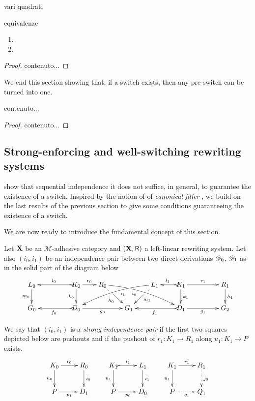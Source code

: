 \begin{remark} 
vari quadrati
\end{remark} 

\begin{lemma}
	equivalenze
	
	\begin{enumerate}
		\item 
		\item 
	\end{enumerate}
\end{lemma}
\begin{proof}
	contenuto...
\end{proof}

We end this section showing that, if a switch exists, then any pre-switch can be turned into one.

\begin{proposition}
	contenuto...
\end{proposition}
\begin{proof}
	contenuto...
\end{proof}


\subsection{Strong-enforcing and well-switching rewriting systems}

 show that sequential independence it does not suffice, in general, to guarantee the existence of a switch.  Inspired by the notion of of \emph{canonical filler}
\cite{heindel2009category}, we build on the last results of the previous section to give some conditions guaranteeing the existence of a switch. 




We are now ready to introduce the fundamental concept of this section.

\begin{definition}
	\label{def:strong}
	Let $\textbf {\textup{X}}$ be an $\mathcal{M}$-adhesive category 
	and $(\textbf {\textup{X}}, \mathsf{R})$ a left-linear rewriting system. 
	Let also $(i_0, i_1)$ be an independence pair between two direct
	derivations $\mathscr{D}_0$, $\mathscr{D}_1$
	as in the solid part of the diagram below
	\[\xymatrix@R=20pt@C=20pt{L_0 \ar[d]_{m_0}&& K_0
	\ar[d]_{k_0}\ar@{>->}[ll]_{l_0} \ar[r]^{r_0} & R_0
	\ar@/^.25cm/[drrr]|(.32)\hole_(.4){i_0}
	\ar[dr]|(.33)\hole_{h_0} && L_1 \ar@/_.25cm/[dlll]^(.4){i_1}
	\ar[dl]|(.33)\hole^{m_1}& K_1 \ar[d]^{k_1}\ar@{>->}[l]_{l_1}
	\ar[rr]^{r_1} && R_1 \ar[d]^{h_1}\\G_0 && \ar@{>->}[ll]^{f_0}
	D_0 \ar[rr]_{g_0}&& G_1 && \ar@{>->}[ll]^{f_1} D_1
	\ar[rr]_{g_1}&& G_2}
\]
	
	We say that $(i_0, i_1)$ is a \emph{strong independence pair} if
	the first two squares depicted  
	below are pushouts and if the pushout of $r_1 : K_1 \to R_1$ along $u_1 : K_1 \to P$ exists.
	\[
	\xymatrix{
		K_0 \ar[r]^{r_0} \ar[d]_{u_0}& R_0 \ar[d]^{i_0} & K_1
		\ar@{>->}[r]^{l_1} \ar[d]_{u_1}& L_1 \ar[d]^{i_1}
		&K_1 \ar[r]^{r_1} \ar[d]_{u_1}& R_1\ar@{.>}[d]^{j_0}
		\\
		P \ar[r]_{p_1} & D_1 &P \ar[r]_{p_0} & D_0
		& P \ar@{.>}[r]_{q_1} & Q_1
	}
	\]
\end{definition}

